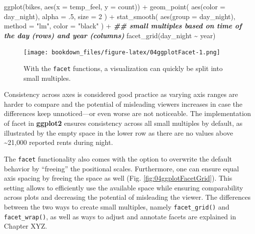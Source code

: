 \documentclass[
]{krantz}
\makeatletter
\newenvironment{Shaded}{\begin{snugshade}}{\end{snugshade}}
\newcommand{\AttributeTok}[1]{\textcolor[rgb]{0.61,0.61,0.61}{#1}}
\newcommand{\DecValTok}[1]{\textcolor[rgb]{0.06,0.06,0.06}{#1}}
\newcommand{\DocumentationTok}[1]{\textcolor[rgb]{0.37,0.37,0.37}{\textbf{\textit{#1}}}}
\newcommand{\FunctionTok}[1]{\textcolor[rgb]{0,0,0}{#1}}
\newcommand{\NormalTok}[1]{#1}
\newcommand{\SpecialCharTok}[1]{\textcolor[rgb]{0,0,0}{#1}}
\newcommand{\StringTok}[1]{\textcolor[rgb]{0.5,0.5,0.5}{#1}}
\newenvironment{kframe}{%
\medskip{}
\setlength{\fboxsep}{.8em}
 \def\at@end@of@kframe{}%
 \ifinner\ifhmode%
  \def\at@end@of@kframe{\end{minipage}}%
  \begin{minipage}{\columnwidth}%
 \fi\fi%
 \def\FrameCommand##1{\hskip\@totalleftmargin \hskip-\fboxsep
 \colorbox{shadecolor}{##1}\hskip-\fboxsep
     \hskip-\linewidth \hskip-\@totalleftmargin \hskip\columnwidth}%
 \MakeFramed {\advance\hsize-\width
   \@totalleftmargin\z@ \linewidth\hsize
   \@setminipage}}%
 {\par\unskip\endMakeFramed%
 \at@end@of@kframe}
\renewenvironment{Shaded}{\begin{kframe}}{\end{kframe}}
\makeatother
\begin{document}
\begin{Shaded}
\begin{Highlighting}[]
\FunctionTok{ggplot}\NormalTok{(bikes, }\FunctionTok{aes}\NormalTok{(}\AttributeTok{x =}\NormalTok{ temp\_feel, }\AttributeTok{y =}\NormalTok{ count)) }\SpecialCharTok{+} 
  \FunctionTok{geom\_point}\NormalTok{(}
    \FunctionTok{aes}\NormalTok{(}\AttributeTok{color =}\NormalTok{ day\_night), }\AttributeTok{alpha =}\NormalTok{ .}\DecValTok{5}\NormalTok{, }\AttributeTok{size =} \DecValTok{2}
\NormalTok{  ) }\SpecialCharTok{+} 
  \FunctionTok{stat\_smooth}\NormalTok{(}
    \FunctionTok{aes}\NormalTok{(}\AttributeTok{group =}\NormalTok{ day\_night), }\AttributeTok{method =} \StringTok{"lm"}\NormalTok{, }\AttributeTok{color =} \StringTok{"black"}
\NormalTok{  ) }\SpecialCharTok{+}
  \DocumentationTok{\#\# small multiples based on time of the day (rows) and year (columns)}
  \FunctionTok{facet\_grid}\NormalTok{(day\_night }\SpecialCharTok{\textasciitilde{}}\NormalTok{ year)}
\end{Highlighting}
\end{Shaded}

\begin{figure}
\centering
\texttt{[image: bookdown\_files/figure-latex/04ggplotFacet-1.png]}
\caption{\label{fig:04ggplotFacet}With the \texttt{facet} functions, a visualization can quickly be split into small multiples.}
\end{figure}

Consistency across axes is considered good practice as varying axis ranges are harder to compare and the potential of misleading viewers increases in case the differences keep unnoticed---or even worse are not noticeable. The implementation of facet in \textbf{ggplot2} ensures consistency across all small multiples by default, as illustrated by the empty space in the lower row as there are no values above \textasciitilde21,000 reported rents during night.

The \texttt{facet} functionality also comes with the option to overwrite the default behavior by ``freeing'' the positional scales. Furthermore, one can ensure equal axis spacing by freeing the space as well (Fig. \ref{fig:04ggplotFacetGrid}). This setting allows to efficiently use the available space while ensuring comparability across plots and decreasing the potential of misleading the viewer. The differences between the two ways to create small multiples, namely \texttt{facet\_grid()} and \texttt{facet\_wrap()}, as well as ways to adjust and annotate facets are explained in Chapter XYZ.
\end{document}
